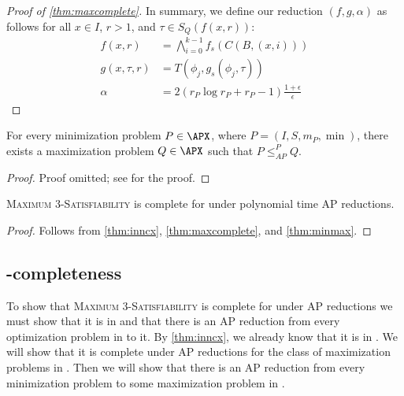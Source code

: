 \documentclass[]{article}
\newcommand{\APr}{\leq_{AP}^{P}}
\begin{document}
\begin{proof}[Proof of \autoref{thm:maxcomplete}]
  In summary, we define our reduction $(f, g, \alpha)$ as follows for all $x \in I$, $r > 1$, and $\tau \in S_Q(f(x, r))$:
  \begin{align*}
    f(x, r) & = \bigwedge_{i = 0}^{k - 1}{f_s(C(B, (x, i)))} \\
    g(x, \tau, r) & = T(\phi_j, g_s(\phi_j, \tau)) \\
    \alpha & = 2(r_P \log{r_P} + r_P - 1)\frac{1 + \epsilon}{\epsilon}
  \end{align*}
\end{proof}

\begin{theorem}\label{thm:minmax}
  For every minimization problem $P \in \APX$, where $P = (I, S, m_P, \min)$, there exists a maximization problem $Q \in \APX$ such that $P \APr Q$.
\end{theorem}
\begin{proof}
  Proof omitted; see \cite{book} for the proof.
\end{proof}

\begin{corollary}
  \textsc{Maximum 3-Satisfiability} is complete for \APX{} under polynomial time AP reductions.
\end{corollary}
\begin{proof}
  Follows from \autoref{thm:inncx}, \autoref{thm:maxcomplete}, and \autoref{thm:minmax}.
\end{proof}

\subsection{\texorpdfstring{\NCX}{NCX}-completeness}\label{ssc:ncxcomplete}

To show that \textsc{Maximum 3-Satisfiability} is complete for \NCX{} under \NC{} AP reductions we must show that it is in \NCX{} and that there is an \NC{} AP reduction from every optimization problem in \NCX{} to it.
By \autoref{thm:inncx}, we already know that it is in \NCX.
We will show that it is complete under \NC{} AP reductions for the class of maximization problems in \NCX.
Then we will show that there is an \NC{} AP reduction from every minimization problem to some maximization problem in \NCX.
\end{document}
